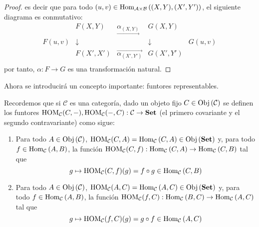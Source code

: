 \documentclass[12pt]{report}
\newcounter{it}
\theoremstyle{largebreak}
\newcommand\cf[3]{\ensuremath{#1:#2\rightarrow#3}}
\newcommand{\Obj}[1]{\ensuremath{\textup{Obj}\left(#1\right)}}
\newcommand{\Hom}[3]{\ensuremath{\textup{Hom}_{#1}\left(#2,#3\right)}}
\newcommand{\Cat}[1]{\ensuremath{\textup{\textbf{#1}}}}
\begin{document}
\begin{proof}
        es decir que para todo $(u,v)\in\Hom{\mathcal{A}\times\mathcal{B}}{(X,Y)}{(X',Y')}$, el siguiente diagrama es conmutativo:
        \begin{equation*}
            \begin{array}{rcccl}
                &F(X,Y) & \underset{\longrightarrow}{\alpha_{(X,Y)}} & G(X,Y) &\\
                F(u,v) & \downarrow & & \downarrow & G(u,v) \\
                &F(X',X') & \overset{\longrightarrow}{\alpha_{ (X',Y')}} & G(X',Y') &\\
            \end{array}
        \end{equation*}
        por tanto, $\cf{\alpha}{F}{G}$ es una transformación natural.
    \end{proof}

    Ahora se introducirá un concepto importante: funtores representables.

    \begin{obs}
        Recordemos que si $\mathcal{C}$ es una categoría, dado un objeto fijo $C\in\Obj{\mathcal{C}}$ se definen los funtores $\cf{\HOM{\mathcal{C}}(C,-),\HOM{\mathcal{C}}(-,C)}{\mathcal{C}}{\Cat{Set}}$ (el primero covariante y el segundo contravariante) como sigue:
        \begin{enumerate}
            \item Para todo $A\in\Obj{\mathcal{C}}$, $\HOM{\mathcal{C}}(C,A)=\Hom{\mathcal{C}}{C}{A}\in\Obj{\Cat{Set}}$ y, para todo $f\in\Hom{\mathcal{C}}{A}{B}$, la función $\cf{\HOM{\mathcal{C}}(C,f)}{\Hom{\mathcal{C}}{C}{A}}{\Hom{\mathcal{C}}{C}{B}}$ tal que
            \begin{equation*}
                g\mapsto \HOM{\mathcal{C}}(C,f)(g)=f\circ g\in\Hom{\mathcal{C}}{C}{B}
            \end{equation*}
            \item Para todo $A\in\Obj{\mathcal{C}}$, $\HOM{\mathcal{C}}(A,C)=\Hom{\mathcal{C}}{A}{C}\in\Obj{\Cat{Set}}$ y, para todo $f\in\Hom{\mathcal{C}}{A}{B}$, la función $\cf{\HOM{\mathcal{C}}(f,C)}{\Hom{\mathcal{C}}{B}{C}}{\Hom{\mathcal{C}}{A}{C}}$ tal que
            \begin{equation*}
                g\mapsto \HOM{\mathcal{C}}(f,C)(g)=g\circ f\in\Hom{\mathcal{C}}{A}{C}
            \end{equation*}
        \end{enumerate}
    \end{obs}
\end{document}
